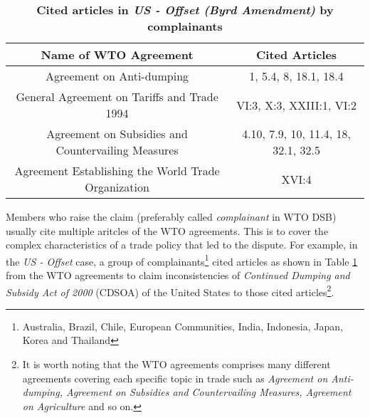 \begin{table}[t!]
   \setlength\tabcolsep{15pt}
   \begin{tabular}{ c | c }
       \hline
       \textbf{\normalsize Name of WTO Agreement}          & \textbf{\normalsize Cited Articles} \\
       \hline \hline
       Agreement on Anti-dumping                           & 1, 5.4, 8, 18.1, 18.4               \\ \hline
       General Agreement on Tariffs and Trade 1994         & VI:3, X:3, XXIII:1, VI:2            \\ \hline
       Agreement on Subsidies and Countervailing Measures  & 4.10, 7.9, 10, 11.4, 18, 32.1, 32.5 \\ \hline
       Agreement Establishing the World Trade Organization & XVI:4                               \\ \hline
   \end{tabular}
   \caption{\textbf{Cited articles in \textit{US - Offset (Byrd Amendment)} by complainants}}
   \label{xltabular:cited-article-for-us-offset}
\end{table}

Members who raise the claim (preferably called \textit{complainant} in WTO DSB) usually cite multiple aritcles of the WTO agreements. This is to cover the complex characteristics of a trade policy that led to the dispute.
For example, in the
\textit{US - Offset} case,
a group of complainants\footnote{Australia,
   Brazil,
   Chile,
   European Communities,
   India,
   Indonesia,
   Japan,
   Korea and Thailand}
cited articles as shown in Table \ref{xltabular:cited-article-for-us-offset} from the WTO agreements to claim inconsistencies of \textit{Continued Dumping and Subsidy Act of 2000} (CDSOA) of the United States to those cited articles\footnote{It is worth noting that the WTO agreements comprises many different agreements covering each specific topic in trade such as \textit{Agreement on Anti-dumping, Agreement on Subsidies and Countervailing Measures, Agreement on Agriculture} and so on.}.

